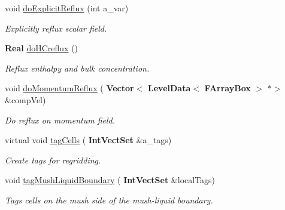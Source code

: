 \begin{DoxyCompactItemize}
\mbox{\label{class_a_m_r_level_mushy_layer_a296b5accca2569adda4f91b90f0213e0}} 
void \hyperlink{class_a_m_r_level_mushy_layer_a296b5accca2569adda4f91b90f0213e0}{do\+Explicit\+Reflux} (int a\+\_\+var)
\begin{DoxyCompactList}\small\item\em Explicitly reflux scalar field. \end{DoxyCompactList}\item 
\mbox{\label{class_a_m_r_level_mushy_layer_ad6c20b4a85790c49eab030f6909a0a0b}} 
\textbf{ Real} \hyperlink{class_a_m_r_level_mushy_layer_ad6c20b4a85790c49eab030f6909a0a0b}{do\+H\+Creflux} ()
\begin{DoxyCompactList}\small\item\em Reflux enthalpy and bulk concentration. \end{DoxyCompactList}\item 
\mbox{\label{class_a_m_r_level_mushy_layer_aee6c4114796ab78aaa088d65e8e749d6}} 
void \hyperlink{class_a_m_r_level_mushy_layer_aee6c4114796ab78aaa088d65e8e749d6}{do\+Momentum\+Reflux} (\textbf{ Vector}$<$ \textbf{ Level\+Data}$<$ \textbf{ F\+Array\+Box} $>$ $\ast$$>$ \&comp\+Vel)
\begin{DoxyCompactList}\small\item\em Do reflux on momentum field. \end{DoxyCompactList}\item 
\mbox{\label{class_a_m_r_level_mushy_layer_aff274f3682a706271fc3a26eefb0be20}} 
virtual void \hyperlink{class_a_m_r_level_mushy_layer_aff274f3682a706271fc3a26eefb0be20}{tag\+Cells} (\textbf{ Int\+Vect\+Set} \&a\+\_\+tags)
\begin{DoxyCompactList}\small\item\em Create tags for regridding. \end{DoxyCompactList}\item 
\mbox{\label{class_a_m_r_level_mushy_layer_a3bfdf4f5d7260b8f6f834777ce8a7650}} 
void \hyperlink{class_a_m_r_level_mushy_layer_a3bfdf4f5d7260b8f6f834777ce8a7650}{tag\+Mush\+Liquid\+Boundary} (\textbf{ Int\+Vect\+Set} \&local\+Tags)
\begin{DoxyCompactList}\small\item\em Tags cells on the mush side of the mush-\/liquid boundary. \end{DoxyCompactList}\item 
$$
\end{DoxyCompactItemize}
